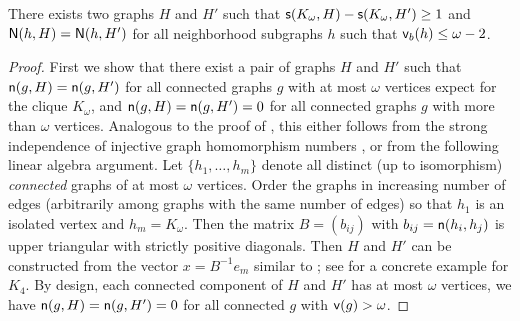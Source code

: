\begin{lemma} \label{lmm:general_clique_neighborhood}
There exists two graphs $ H $ and $ H' $ such that $ \mathsf{s}(K_{\omega}, H) - \mathsf{s}(K_{\omega}, H') \geq 1 $ and $ {\mathsf{N}}(h, H) = {\mathsf{N}}(h, H') $ for all neighborhood subgraphs $ h $ such that $ {\mathsf{v}}_b(h) \leq \omega-2 $.
\end{lemma}
\begin{proof}
First we show that there exist a pair of graphs $H$ and $H'$ such that $\mathsf{n}(g,H)=\mathsf{n}(g,H')$ for all connected graphs $g$ with at most $\omega$ vertices expect for the clique $K_\omega$, and $\mathsf{n}(g,H)=\mathsf{n}(g,H')=0$ for all connected graphs $g$ with more than $\omega$ vertices. 
Analogous to the proof of , this either follows from the strong independence of injective graph homomorphism numbers \cite{Erdos1979}, or from the following linear algebra argument. Let $\{h_1,\ldots,h_m\}$ denote all distinct (up to isomorphism) \emph{connected} graphs of at most $\omega$ vertices. Order the graphs in increasing number of edges (arbitrarily among graphs with the same number of edges) so that $h_1$ is an isolated vertex and $h_m=K_{\omega}$. Then the matrix $B=(b_{ij})$ with $b_{ij} = \mathsf{n}(h_i,h_j)$ is upper triangular with strictly positive diagonals. Then $H$ and $H'$ can be constructed from the vector $x = B^{-1} e_m$ similar to ; see  for a concrete example for $K_4$.
By design, each connected component of $H$ and $H'$ has at most $\omega$ vertices, we have $\mathsf{n}(g,H)=\mathsf{n}(g,H')=0$ for all connected $g$ with ${\mathsf{v}}(g)>\omega$.


\end{proof}
